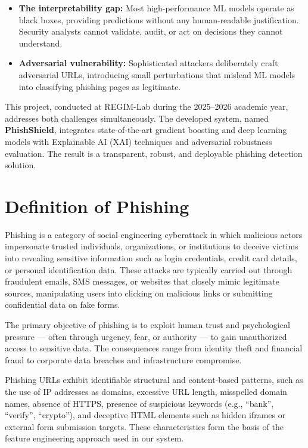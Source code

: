 \begin{itemize}
    \item \textbf{The interpretability gap:} Most high-performance ML models operate as black boxes, providing predictions without any human-readable justification. Security analysts cannot validate, audit, or act on decisions they cannot understand.
    \item \textbf{Adversarial vulnerability:} Sophisticated attackers deliberately craft adversarial URLs, introducing small perturbations that mislead ML models into classifying phishing pages as legitimate.
\end{itemize}

This project, conducted at REGIM-Lab during the 2025--2026 academic year, addresses both challenges simultaneously. The developed system, named \textbf{PhishShield}, integrates state-of-the-art gradient boosting and deep learning models with Explainable AI (XAI) techniques and adversarial robustness evaluation. The result is a transparent, robust, and deployable phishing detection solution.

\section{Definition of Phishing}

Phishing is a category of social engineering cyberattack in which malicious actors impersonate trusted individuals, organizations, or institutions to deceive victims into revealing sensitive information such as login credentials, credit card details, or personal identification data. These attacks are typically carried out through fraudulent emails, SMS messages, or websites that closely mimic legitimate sources, manipulating users into clicking on malicious links or submitting confidential data on fake forms.

The primary objective of phishing is to exploit human trust and psychological pressure — often through urgency, fear, or authority — to gain unauthorized access to sensitive data. The consequences range from identity theft and financial fraud to corporate data breaches and infrastructure compromise.

Phishing URLs exhibit identifiable structural and content-based patterns, such as the use of IP addresses as domains, excessive URL length, misspelled domain names, absence of HTTPS, presence of suspicious keywords (e.g., ``bank'', ``verify'', ``crypto''), and deceptive HTML elements such as hidden iframes or external form submission targets. These characteristics form the basis of the feature engineering approach used in our system.

